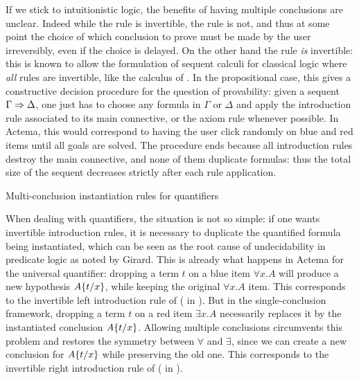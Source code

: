 If we stick to intuitionistic logic, the benefits of having multiple conclusions
are unclear. Indeed while the {} rule is invertible, the
{} rule is not, and thus at some point the choice of which
conclusion to prove must be made by the user irreversibly, even if the choice is
delayed. On the other hand the
{} rule \emph{is} invertible: this is known to allow the
formulation of sequent calculi for classical logic where \emph{all} rules are
invertible, like the  calculus of . In
the propositional case, this gives a constructive decision procedure for the
question of provability: given a sequent $\Gamma \Rightarrow \Delta$, one just has to
choose any formula in $\Gamma$ or $\Delta$ and apply the introduction rule
associated to its main connective, or the axiom rule whenever possible. In
Actema, this would correspond to having the user click randomly on blue and red
items until all goals are solved. The procedure ends because all introduction
rules destroy the main connective, and none of them duplicate formulas: thus the
total size of the sequent decreases strictly after each rule application.

\begin{marginfigure}
  \caption{Multi-conclusion instantiation rules for quantifiers}
\end{marginfigure}

When dealing with quantifiers, the situation is not so simple: if one wants
invertible introduction rules, it is necessary to duplicate the quantified
formula being instantiated, which can be seen as the root cause of
undecidability in predicate logic as noted by
Girard\cite[Section~3.3.2]{girard:hal-01322183}. This is already what happens in
Actema for the universal quantifier: dropping a term $t$ on a blue item $\forall
x. A$ will produce a new hypothesis $A \{ t / x \}$, while keeping the
original $\forall x. A$ item. This corresponds to the invertible left
introduction rule of  ({} in ).
But in the single-conclusion framework, dropping a term $t$ on a red item
$\exists x. A$ necessarily replaces it by the instantiated conclusion
$A \{ t / x \}$. Allowing multiple conclusions circumvents this problem and
restores the symmetry between $\forall$ and $\exists$, since we can create a new
conclusion for $A \{ t / x \}$ while preserving the old one. This corresponds
to the invertible right introduction rule of  ({} in
).

